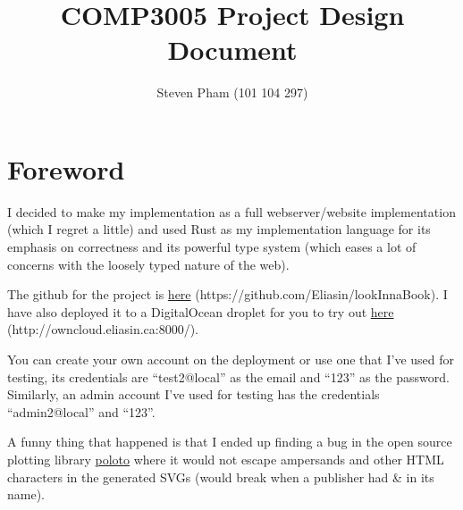 \documentclass{article}
\title{COMP3005 Project Design Document}
\author{Steven Pham (101 104 297)}
\begin{document}
\maketitle

\section{Foreword}
I decided to make my implementation as a full webserver/website implementation (which I regret a little) and used Rust as my implementation language for its emphasis on correctness and its powerful type system (which eases a lot of concerns with the loosely typed nature of the web).

The github for the project is \href{https://github.com/Eliasin/lookInnaBook}{here} (https://github.com/Eliasin/lookInnaBook). I have also deployed it to a DigitalOcean droplet for you to try out \href{http://owncloud.eliasin.ca:8000/}{here} (http://owncloud.eliasin.ca:8000/).

You can create your own account on the deployment or use one that I've used for testing, its credentials are ``test2@local'' as the email and ``123'' as the password. Similarly, an admin account I've used for testing has the credentials ``admin2@local'' and ``123''.

A funny thing that happened is that I ended up finding a bug in the open source plotting library \href{https://lib.rs/crates/poloto}{poloto} where it would not escape ampersands and other HTML characters in the generated SVGs (would break when a publisher had \& in its name).
\end{document}
